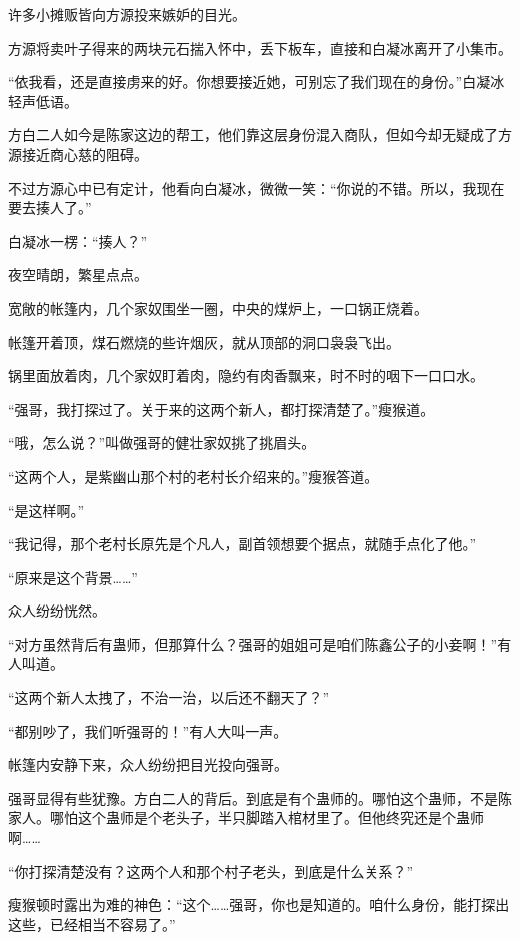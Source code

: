 
\begin{this_body}

许多小摊贩皆向方源投来嫉妒的目光。

方源将卖叶子得来的两块元石揣入怀中，丢下板车，直接和白凝冰离开了小集市。

“依我看，还是直接虏来的好。你想要接近她，可别忘了我们现在的身份。”白凝冰轻声低语。

方白二人如今是陈家这边的帮工，他们靠这层身份混入商队，但如今却无疑成了方源接近商心慈的阻碍。

不过方源心中已有定计，他看向白凝冰，微微一笑：“你说的不错。所以，我现在要去揍人了。”

白凝冰一楞：“揍人？”

夜空晴朗，繁星点点。

宽敞的帐篷内，几个家奴围坐一圈，中央的煤炉上，一口锅正烧着。

帐篷开着顶，煤石燃烧的些许烟灰，就从顶部的洞口袅袅飞出。

锅里面放着肉，几个家奴盯着肉，隐约有肉香飘来，时不时的咽下一口口水。

“强哥，我打探过了。关于来的这两个新人，都打探清楚了。”瘦猴道。

“哦，怎么说？”叫做强哥的健壮家奴挑了挑眉头。

“这两个人，是紫幽山那个村的老村长介绍来的。”瘦猴答道。

“是这样啊。”

“我记得，那个老村长原先是个凡人，副首领想要个据点，就随手点化了他。”

“原来是这个背景……”

众人纷纷恍然。

“对方虽然背后有蛊师，但那算什么？强哥的姐姐可是咱们陈鑫公子的小妾啊！”有人叫道。

“这两个新人太拽了，不治一治，以后还不翻天了？”

“都别吵了，我们听强哥的！”有人大叫一声。

帐篷内安静下来，众人纷纷把目光投向强哥。

强哥显得有些犹豫。方白二人的背后。到底是有个蛊师的。哪怕这个蛊师，不是陈家人。哪怕这个蛊师是个老头子，半只脚踏入棺材里了。但他终究还是个蛊师啊……

“你打探清楚没有？这两个人和那个村子老头，到底是什么关系？”

瘦猴顿时露出为难的神色：“这个……强哥，你也是知道的。咱什么身份，能打探出这些，已经相当不容易了。”


\end{this_body}
